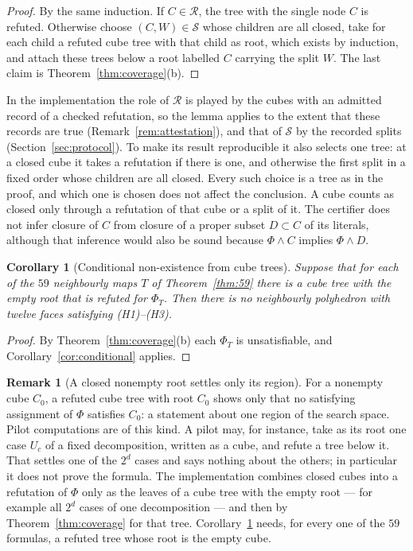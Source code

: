 \documentclass[11pt,reqno]{amsart}
\theoremstyle{plain}
\newtheorem{corollary}[theorem]{Corollary}
\theoremstyle{definition}
\newtheorem{remark}[theorem]{Remark}
\begin{document}
\begin{proof}
By the same induction. If $C\in\mathcal{R}$, the tree with the single node $C$ is refuted.
Otherwise choose $(C,W)\in\mathcal{S}$ whose children are all closed, take for each child a
refuted cube tree with that child as root, which exists by induction, and attach these trees below
a root labelled $C$ carrying the split $W$. The last claim is Theorem~\ref{thm:coverage}(b).
\end{proof}

In the implementation the role of $\mathcal{R}$ is played by the cubes with an admitted record of a
checked refutation, so the lemma applies to the extent that these records are true
(Remark~\ref{rem:attestation}), and that of $\mathcal{S}$ by the recorded splits
(Section~\ref{sec:protocol}). To make its result
reproducible it also selects one tree: at a closed cube it takes a refutation if there is one, and
otherwise the first split in a fixed order whose children are all closed. Every such choice is a
tree as in the proof, and which one is chosen does not affect the conclusion. A cube counts as
closed only through a refutation of that cube or a split of it. The certifier does not
infer closure of $C$ from closure of a proper subset $D\subset C$ of its literals,
although that inference would also be sound because $\Phi\wedge C$ implies $\Phi\wedge D$.

\begin{corollary}[Conditional non-existence from cube trees]\label{cor:treecover}
Suppose that for each of the $59$ neighbourly maps $T$ of Theorem~\ref{thm:59} there is a cube tree
with the empty root that is refuted for $\Phi_T$. Then there is no neighbourly polyhedron with
twelve faces satisfying \textup{(H1)--(H3)}.
\end{corollary}

\begin{proof}
By Theorem~\ref{thm:coverage}(b) each $\Phi_T$ is unsatisfiable, and Corollary~\ref{cor:conditional}
applies.
\end{proof}

\begin{remark}[A closed nonempty root settles only its region]\label{rem:pilotroot}
For a nonempty cube $C_0$, a refuted cube tree with root $C_0$ shows only that no satisfying
assignment of $\Phi$ satisfies $C_0$: a statement about one region of the search space. Pilot
computations are of this kind. A pilot may, for instance, take as its root one case $U_c$ of a
fixed decomposition, written as a cube, and refute a tree below it. That settles one of the $2^d$
cases and says nothing about the others; in particular it does not prove the formula. The
implementation combines closed cubes into a refutation of $\Phi$ only as the leaves of a cube tree
with the empty root --- for example all $2^d$ cases of one decomposition --- and then by
Theorem~\ref{thm:coverage} for that tree. Corollary~\ref{cor:treecover} needs, for every one of
the $59$ formulas, a refuted tree whose root is the empty cube.
\end{remark}
\end{document}
